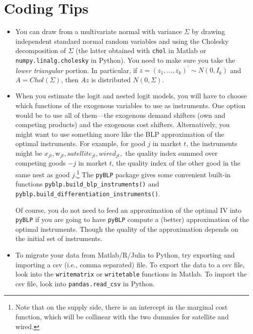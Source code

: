 \documentclass{article}
\begin{document}
\section*{Coding Tips}
\begin{tcolorbox}
\begin{itemize}
 \item You can draw from a multivariate normal with variance $\Sigma $ by
drawing independent standard normal random variables and using the Cholesky
decomposition of $\Sigma $ (the latter obtained with \texttt{chol} in Matlab or \texttt{numpy.linalg.cholesky} in Python). You need to make sure you take the \textit{lower triangular} portion.
In particular, if $z=(z_{1},\ldots ,z_{k})^{\prime }\sim N(0,I_{k})$ and $%
A=Chol(\Sigma )$, then $Az$ is distributed $N(0,\Sigma )$.

\item When you estimate the logit and nested logit models, you will have to choose which functions of the exogenous variables to use as instruments.  One option would be to use all of them---the exogenous demand shifters (own and competing products) and the exogenous cost shifters. Alternatively, you might want to use something more like the BLP approximation of the optimal instruments. For example,  for good $j$ in market $t$, the instruments might be $x_{jt},\text{w}_{jt}, satellite_{jt}, wired_{jt},$ the quality index summed over competing goods $-j$ in market $t$, the quality index of the other good in the same nest as good $j$.\footnote{ Note that on the supply side, there is an intercept in the marginal cost function, which will be collinear with the two dummies for satellite and wired.} The \texttt{pyBLP} package gives some convenient built-in functions \texttt{pyblp.build\_blp\_instruments()} and \texttt{pyblp.build\_differentiation\_instruments()}.

Of course, you do not need to feed an approximation of the optimal IV into \texttt{pyBLP} if you are going to have \texttt{pyBLP} compute a (better) approximation of the optimal instruments. Though the quality of the approximation depends on the initial set of instruments.

\item To migrate your data from
Matlab/R/Julia  to Python, try exporting and importing a csv (i.e., comma separated)
file.  To export the  data to a csv file, look into the \texttt{writematrix}
or \texttt{writetable} functions in Matlab. To import the csv file, look
into \texttt{pandas.read\_csv} in Python.


\end{itemize}
\end{tcolorbox}
\end{document}
